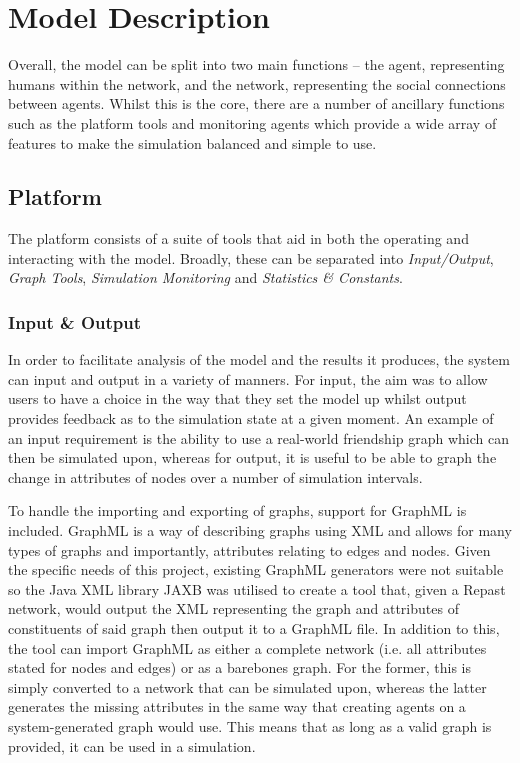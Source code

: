 \documentclass[]{report}
\begin{document}
\section{Model Description}
Overall, the model can be split into two main functions – the agent, representing humans within the network, and the network, representing the social connections between agents. Whilst this is the core, there are a number of ancillary functions such as the platform tools and monitoring agents which provide a wide array of features to make the simulation balanced and simple to use.

\subsection{Platform}
\label{sec:platform}
The platform consists of a suite of tools that aid in both the operating and interacting with the model. Broadly, these can be separated into \emph{Input/Output}, \emph{Graph Tools}, \emph{Simulation Monitoring} and \emph{Statistics \& Constants}.

\subsubsection{Input \& Output}
In order to facilitate analysis of the model and the results it produces, the system can input and output in a variety of manners. For input, the aim was to allow users to have a choice in the way that they set the model up whilst output provides feedback as to the simulation state at a given moment. An example of an input requirement is the ability to use a real-world friendship graph which can then be simulated upon, whereas for output, it is useful to be able to graph the change in attributes of nodes over a number of simulation intervals.

To handle the importing and exporting of graphs, support for GraphML is included. GraphML is a way of describing graphs using XML and allows for many types of graphs and importantly, attributes relating to edges and nodes\cite{graphml}. Given the specific needs of this project, existing GraphML generators were not suitable so the Java XML library JAXB was utilised to create a tool that, given a Repast network, would output the XML representing the graph and attributes of constituents of said graph then output it to a GraphML file. In addition to this, the tool can import GraphML as either a complete network (i.e. all attributes stated for nodes and edges) or as a barebones graph. For the former, this is simply converted to a network that can be simulated upon, whereas the latter generates the missing attributes in the same way that creating agents on a system-generated graph would use. This means that as long as a valid graph is provided, it can be used in a simulation.
\end{document}
